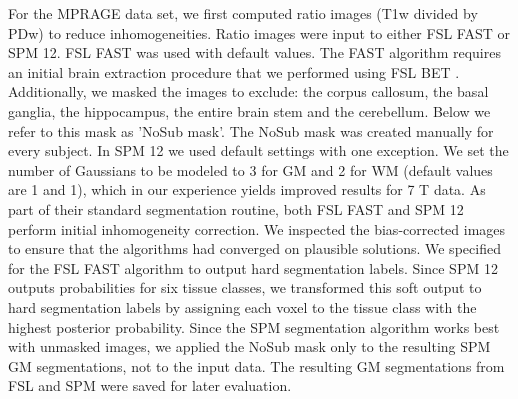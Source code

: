 For the MPRAGE data set, we first computed ratio images (T1w divided by PDw) \parencite{Moortele2009} to reduce inhomogeneities. Ratio images were input to either FSL FAST or SPM 12. FSL FAST was used with default values. The FAST algorithm requires an initial brain extraction procedure that we performed using FSL BET \parencite{Smith2002}. Additionally, we masked the images to exclude: the corpus callosum, the basal ganglia, the hippocampus, the entire brain stem and the cerebellum. Below we refer to this mask as 'NoSub mask'. The NoSub mask was created manually for every subject. In SPM 12 we used default settings with one exception. We set the number of Gaussians to be modeled to 3 for GM and 2 for WM (default values are 1 and 1), which in our experience yields improved results for 7 T data. As part of their standard segmentation routine, both FSL FAST and SPM 12 perform initial inhomogeneity correction. We inspected the bias-corrected images to ensure that the algorithms had converged on plausible solutions. We specified for the FSL FAST algorithm to output hard segmentation labels. Since SPM 12 outputs probabilities for six tissue classes, we transformed this soft output to hard segmentation labels by assigning each voxel to the tissue class with the highest posterior probability. Since the SPM segmentation algorithm works best with unmasked images, we applied the NoSub mask only to the resulting SPM GM segmentations, not to the input data. The resulting GM segmentations from FSL and SPM were saved for later evaluation.

